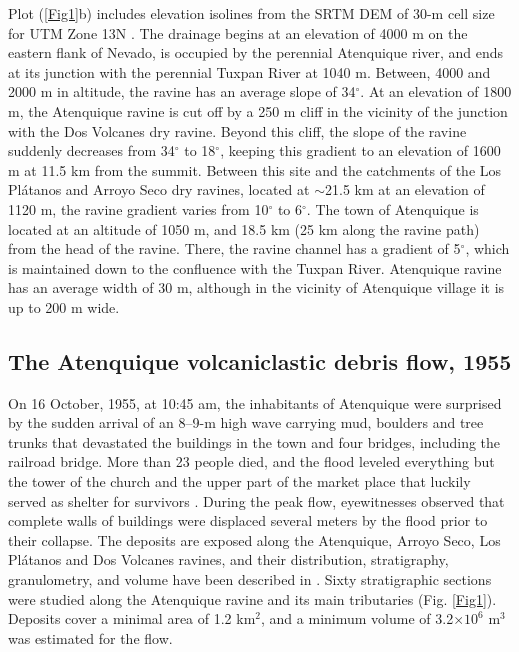 \documentclass[nhess, manuscript]{copernicus}
\begin{document}
Plot (\ref{Fig1}b) includes elevation isolines from the SRTM DEM of 30-m cell size for UTM Zone 13N \citep{NASA2014}. The drainage begins at an elevation of 4000 m on the eastern flank of Nevado, is occupied by the perennial Atenquique river, and ends at its junction with the perennial Tuxpan River at 1040 m. Between, 4000 and 2000 m in altitude, the ravine has an average slope of 34$^\circ$. At an elevation of 1800 m, the Atenquique ravine is cut off by a 250 m cliff in the vicinity of the junction with the Dos Volcanes dry ravine. Beyond this cliff, the slope of the ravine suddenly decreases from 34$^\circ$ to 18$^\circ$, keeping this gradient to an elevation of 1600 m at 11.5 km from the summit. Between this site and the catchments of the Los Pl\'atanos and Arroyo Seco dry ravines, located at $\sim$21.5 km at an elevation of 1120 m, the ravine gradient varies from 10$^\circ$ to 6$^\circ$. The town of Atenquique is located at an altitude of 1050 m, and 18.5 km (25 km along the ravine path) from the head of the ravine. There, the ravine channel has a gradient of 5$^\circ$, which is maintained down to the confluence with the Tuxpan River. Atenquique ravine has an average width of 30 m, although in the vicinity of Atenquique village it is up to 200 m wide.

\subsection{The Atenquique volcaniclastic debris flow, 1955}
On 16 October, 1955, at 10:45 am, the inhabitants of Atenquique were surprised by the sudden arrival of an 8--9-m high wave carrying mud, boulders and tree trunks that devastated the buildings in the town and four bridges, including the railroad bridge. More than 23 people died, and the flood leveled everything but the tower of the church and the upper part of the market place that luckily served as shelter for survivors \citep{PonceSegura1983, Saucedo2008}. During the peak flow, eyewitnesses observed that complete walls of buildings were displaced several meters by the flood prior to their collapse. The deposits are exposed along the Atenquique, Arroyo Seco, Los Pl\'atanos and Dos Volcanes ravines, and their distribution, stratigraphy, granulometry, and volume have been  described in \cite{Saucedo2008}. Sixty stratigraphic sections were studied along the Atenquique ravine and its main tributaries  (Fig. \ref{Fig1}). Deposits cover a minimal area of 1.2 km$^2$, and a minimum volume of 3.2$\times10^6$ m$^3$ was estimated for the flow.
\end{document}
